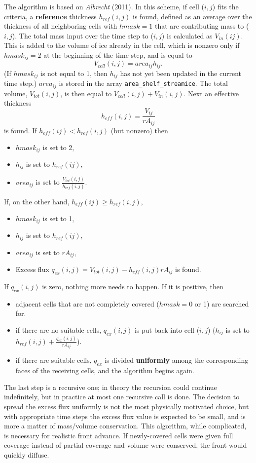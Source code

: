 The algorithm is based on \textit{Albrecht} (2011). In this scheme, if cell ($i,j$) fits the criteria, a \textbf{reference} thickness $h_{ref}(i,j)$ is found, defined as an average over the thickness of all neighboring cells with $hmask=1$ that are contributing mass to ($i,j$). The total mass input over the time step to ($i,j$) is calculated as $V_{in}(ij)$. This is added to the volume of ice already in the cell, which is nonzero only if $hmask_{ij}=2$ at the beginning of the time step, and is equal to
\begin{equation}
V_{cell}(i,j) = area_{ij} h_{ij}.
\end{equation}
(If $hmask_{ij}$ is not equal to 1, then $h_{ij}$ has not yet been updated in the current time step.) $area_{ij}$ is stored in the array \texttt{area\_shelf\_streamice}. The total volume, $V_{tot}(i,j)$, is then equal to $V_{cell}(i,j)+V_{in}(i,j)$. Next an effective thickness
\begin{equation}
h_{eff}(i,j) = \frac{V_{ij}}{rA_{ij}}
\end{equation}
is found. If $h_{eff}(ij)<h_{ref}(i,j)$ (but nonzero) then
\begin{itemize}
\item $hmask_{ij}$ is set to 2,
\item $h_{ij}$ is set to $h_{ref}(ij)$,
\item $area_{ij}$ is set to $\frac{V_{tot}(i,j)}{h_{ref}(i,j)}$.
\end{itemize}
If, on the other hand, $h_{eff}(ij)\geq h_{ref}(i,j)$,
\begin{itemize}
\item $hmask_{ij}$ is set to 1,
\item $h_{ij}$ is set to $h_{ref}(ij)$,
\item $area_{ij}$ is set to $rA_{ij}$,
\item Excess flux $q_{ex}(i,j) = V_{tot}(i,j) - h_{eff}(i,j)rA_{ij}$ is found.
\end{itemize}
If $q_{ex}(i,j)$ is zero, nothing more needs to happen. If it is positive, then
\begin{itemize}
\item adjacent cells that are not completely covered ($hmask=0$ or 1) are searched for.
\item if there are no suitable cells, $q_{ex}(i,j)$ is put back into cell ($i,j$) ($h_{ij}$ is set to $h_{ref}(i,j)+\frac{q_{ex}(i,j)}{rA_{ij}}$).
\item if there are suitable cells, $q_{ex}$ is divided \textbf{uniformly} among the corresponding faces of the receiving cells, and the algorithm begins again.
\end{itemize}
The last step is a recursive one; in theory the recursion could continue indefinitely, but in practice at most one recursive call is done. The decision to spread the excess flux uniformly is not the most physically motivated choice, but with appropriate time steps the excess flux value is expected to be small, and is more a matter of mass/volume conservation. This algorithm, while complicated, is necessary for realistic front advance. If newly-covered cells were given full coverage instead of partial coverage and volume were conserved, the front would quickly diffuse.


